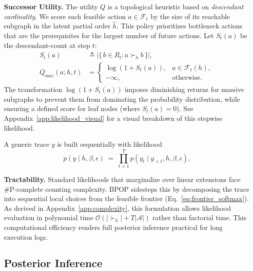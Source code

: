 \documentclass{article}
\theoremstyle{plain}
\theoremstyle{definition}
\theoremstyle{remark}
\begin{document}
\noindent \textbf{Successor Utility.}
The utility $Q$ is a topological heuristic based on \textit{descendant cardinality}. We score each feasible action $a \in \mathcal{F}_t$ by the size of its reachable subgraph in the latent partial order $\widehat{h}$. This policy prioritizes bottleneck actions that are the prerequisites for the largest number of future actions. Let $S_t(a)$ be the descendant-count at step $t$:
\begin{equation} 
\label{eq:q_succ}
\begin{split} 
S_t(a) &\triangleq \left|\{\,b\in R_t : a \succ_{h} b\,\}\right|, \\ 
Q_{\text{succ}}(a;h,t) &= 
\begin{cases} 
\log(1+S_t(a)), & a\in \mathcal{F}_t(h),\\ 
-\infty, & \text{otherwise}. 
\end{cases} 
\end{split} 
\end{equation}
The transformation $\log(1+S_t(a))$ imposes diminishing returns for massive subgraphs to prevent them from dominating the probability distribution, while ensuring a defined score for leaf nodes (where $S_t(a)=0$). See Appendix~\ref{app:likelihood_visual} for a visual breakdown of this stepwise likelihood.

A generic trace $y$ is built sequentially with likelihood
\begin{equation}
p\!\left(y \mid h, \beta, \epsilon\right)
\;=\;
\prod_{t=1}^{T} p\!\left(y_t \mid y_{<t}, h, \beta, \epsilon\right).
\label{eq:trace_likelihood}
\end{equation}

\vspace{-10pt} %
\noindent \textbf{Tractability.} 
Standard likelihoods that marginalize over linear extensions face \#P-complete counting complexity. BPOP sidesteps this by decomposing the trace into sequential local choices from the feasible frontier (Eq.~\ref{eq:frontier_softmax}). As derived in Appendix~\ref{app:complexity}, this formulation allows likelihood evaluation in polynomial time $\mathcal{O}(|\succ_h| + T|\mathcal{A}|)$ rather than factorial time. This computational efficiency renders full posterior inference practical for long execution logs.

\subsection{Posterior Inference}
\label{sec:inference}
\end{document}
